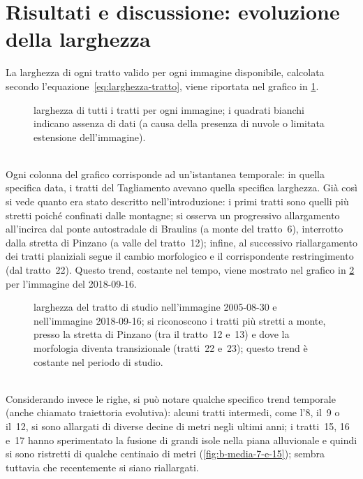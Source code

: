 \section{Risultati e discussione: evoluzione della larghezza}
\label{sec:larghezza}
La larghezza di ogni tratto valido per ogni immagine disponibile, calcolata secondo l'equazione~\eqref{eq:larghezza-tratto}, viene riportata nel grafico in \cref{graph:larghezze-tutti-tratti}.
%
\begin{figure}
	\centering
	
	\caption[larghezza di tutti i tratti per ogni immagine]{larghezza di tutti i tratti per ogni immagine; i quadrati bianchi indicano assenza di dati (a causa della presenza di nuvole o limitata estensione dell'immagine).}
	\label{graph:larghezze-tutti-tratti}
\end{figure}
%
\\
Ogni colonna del grafico corrisponde ad un'istantanea temporale: in quella specifica data, i tratti del Tagliamento avevano quella specifica larghezza.
Già così si vede quanto era stato descritto nell'introduzione:
i primi tratti sono quelli più stretti poiché confinati dalle montagne;
si osserva un progressivo allargamento all'incirca dal ponte autostradale di Braulins (a monte del tratto~6), interrotto dalla stretta di Pinzano (a valle del tratto~12);
infine, al successivo riallargamento dei tratti planiziali segue il cambio morfologico e il corrispondente restringimento (dal tratto~22).
Questo trend, costante nel tempo, viene mostrato nel grafico in \cref{graph:larghezza-2005-2018-09} per l'immagine \Se{} del 2018-09-16.
%
\begin{figure}
	\centering
	
	\caption[larghezza del tratto di studio nel 2005-08-30 e nel 2018-09-16]{larghezza del tratto di studio nell'immagine \AST{} 2005-08-30 e nell'immagine \Se{} 2018-09-16; si riconoscono i tratti più stretti a monte, presso la stretta di Pinzano (tra il tratto~12 e~13) e dove la morfologia diventa transizionale (tratti~22 e~23); questo trend è costante nel periodo di studio.}
	\label{graph:larghezza-2005-2018-09}
\end{figure}
%
\\
Considerando invece le righe, si può notare qualche specifico trend temporale (anche chiamato traiettoria evolutiva):
alcuni tratti intermedi, come l'8, il~9 o il~12, si sono allargati di diverse decine di metri negli ultimi anni;
i tratti~15, 16 e~17 hanno sperimentato la fusione di grandi isole nella piana alluvionale e quindi si sono ristretti di qualche centinaio di metri (\cref{fig:b-media-7-e-15}); sembra tuttavia che recentemente si siano riallargati.
